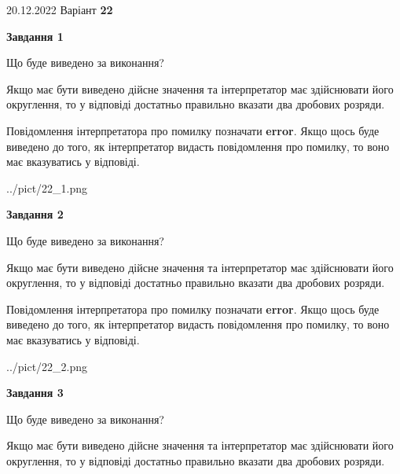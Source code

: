 \documentclass[12pt, ukrainian]{article}
\begin{document}
{20.12.2022 Варіант \No \textbf { 22 }\par}
{
\begin {Large}

{\begin {center}\textbf{Завдання 1}\end {center}}\par
Що буде виведено за виконання? \par

Якщо має бути виведено дійсне значення та інтерпретатор має здійснювати його округлення, 
то у відповіді достатньо правильно вказати два дробових розряди.

Повідомлення інтерпретатора про помилку позначати \textbf{error}.
Якщо щось буде виведено до того, як інтерпретатор видасть повідомлення про помилку, 
то воно має вказуватись у відповіді. \par

\begin{center}
	{../pict/22_1.png}
\end{center}
\newpage

{\begin {center}\textbf{Завдання 2}\end {center}}\par
Що буде виведено за виконання? \par

Якщо має бути виведено дійсне значення та інтерпретатор має здійснювати його округлення, 
то у відповіді достатньо правильно вказати два дробових розряди.

Повідомлення інтерпретатора про помилку позначати \textbf{error}.
Якщо щось буде виведено до того, як інтерпретатор видасть повідомлення про помилку, 
то воно має вказуватись у відповіді. \par

\begin{center}
	{../pict/22_2.png}
\end{center}
\newpage

{\begin {center}\textbf{Завдання 3}\end {center}}\par
Що буде виведено за виконання? \par

Якщо має бути виведено дійсне значення та інтерпретатор має здійснювати його округлення, 
то у відповіді достатньо правильно вказати два дробових розряди.


\end{Large}}
\end{document}
